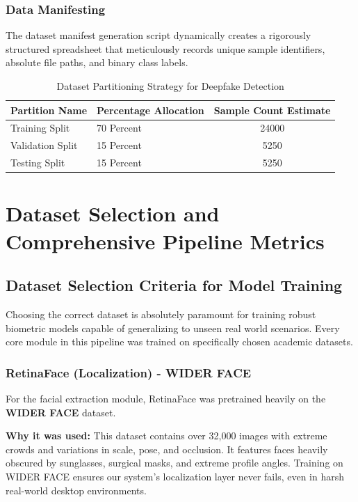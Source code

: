 \documentclass[12pt,a4paper]{report}
\begin{document}
\subsection{Data Manifesting}
The dataset manifest generation script dynamically creates a rigorously structured spreadsheet that meticulously records unique sample identifiers, absolute file paths, and binary class labels. 

\begin{table}[H]
\centering
\caption{Dataset Partitioning Strategy for Deepfake Detection}
\label{tab:dataset_split}
\begin{tabular}{@{}llc@{}}
\toprule
\textbf{Partition Name} & \textbf{Percentage Allocation} & \textbf{Sample Count Estimate} \\ \midrule
Training Split & 70 Percent & 24000 \\
Validation Split & 15 Percent & 5250 \\
Testing Split & 15 Percent & 5250 \\ \bottomrule
\end{tabular}
\end{table}


\chapter{Dataset Selection and Comprehensive Pipeline Metrics}
\section{Dataset Selection Criteria for Model Training}
Choosing the correct dataset is absolutely paramount for training robust biometric models capable of generalizing to unseen real world scenarios. Every core module in this pipeline was trained on specifically chosen academic datasets.

\subsection{RetinaFace (Localization) - WIDER FACE}
For the facial extraction module, RetinaFace was pretrained heavily on the \textbf{WIDER FACE} dataset. 

\textbf{Why it was used:} This dataset contains over 32,000 images with extreme crowds and variations in scale, pose, and occlusion. It features faces heavily obscured by sunglasses, surgical masks, and extreme profile angles. Training on WIDER FACE ensures our system's localization layer never fails, even in harsh real-world desktop environments.
\end{document}
